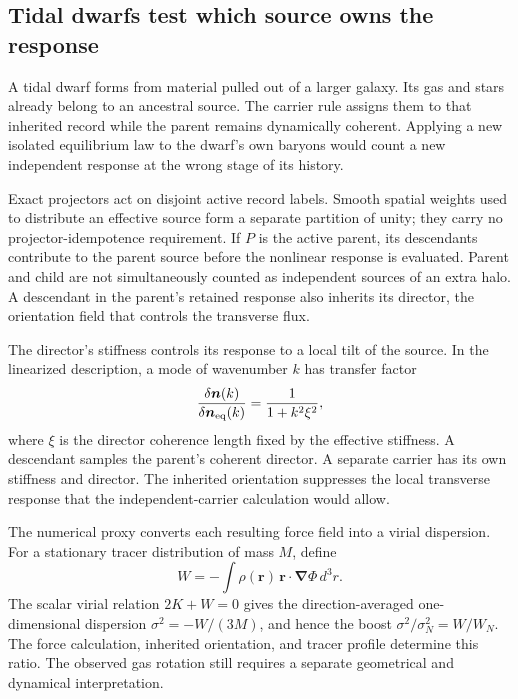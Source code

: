 \subsection{Tidal dwarfs test which source owns the response}

A tidal dwarf forms from material pulled out of a larger galaxy. Its gas
and stars already belong to an ancestral source. The carrier rule assigns
them to that inherited record while the parent remains dynamically
coherent. Applying a new isolated equilibrium law to the dwarf's own
baryons would count a new independent response at the wrong stage of its
history.

Exact projectors act on disjoint active record labels. Smooth spatial
weights used to distribute an effective source form a separate partition
of unity; they carry no projector-idempotence requirement. If $P$
is the active parent, its descendants contribute to the parent source
before the nonlinear response is evaluated. Parent and child are not
simultaneously counted as independent sources of an extra halo. A
descendant in the parent's retained response also inherits its director,
the orientation field that controls the transverse flux.

The director's stiffness controls its response to a local tilt of the
source. In the linearized description, a mode of wavenumber $k$ has
transfer factor
\begin{equation}
\frac{\delta\boldsymbol n(k)}{\delta\boldsymbol n_{\rm eq}(k)}
=\frac{1}{1+k^2\xi^2},
\end{equation}
where $\xi$ is the director coherence length fixed by the effective
stiffness. A descendant samples the parent's coherent director. A
separate carrier has its own stiffness and director. The inherited
orientation suppresses the local transverse response that the
independent-carrier calculation would allow. 

The numerical proxy converts each resulting force field into a virial
dispersion. For a stationary tracer distribution of mass $M$, define
\begin{equation}
W=-\int\rho(\boldsymbol r)\,
\boldsymbol r\cdot\boldsymbol\nabla\Phi\,d^3r.
\end{equation}
The scalar virial relation $2K+W=0$ gives the direction-averaged
one-dimensional dispersion $\sigma^2=-W/(3M)$, and hence the boost
$\sigma^2/\sigma_N^2=W/W_N$. The force calculation, inherited orientation,
and tracer profile determine this ratio. The observed gas rotation still
requires a separate geometrical and dynamical interpretation.

